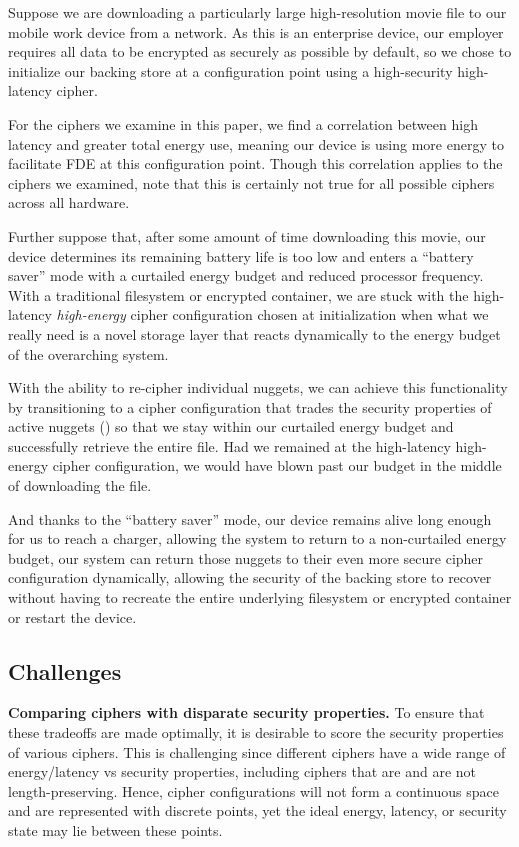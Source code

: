 Suppose we are downloading a particularly large high-resolution movie file to
our mobile work device from a network. As this is an enterprise device, our
employer requires all data to be encrypted as securely as possible by default,
so we chose to initialize our backing store at a configuration point using a
high-security high-latency cipher.

For the ciphers we examine in this paper, we find a correlation between high
latency and greater total energy use, meaning our device is using more
energy to facilitate FDE at this configuration point. Though this correlation
applies to the ciphers we examined, note that this is certainly not true for all
possible ciphers across all hardware.

Further suppose that, after some amount of time downloading this movie, our
device determines its remaining battery life is too low and enters a ``battery
saver'' mode with a curtailed energy budget and reduced processor frequency.
With a traditional filesystem or encrypted container, we are stuck with the
high-latency \emph{high-energy} cipher configuration chosen at initialization
when what we really need is a novel storage layer that reacts dynamically to the
energy budget of the overarching system.

With the ability to re-cipher individual nuggets, we can achieve this
functionality by transitioning to a cipher configuration that trades the
security properties of active nuggets () so that we stay within our
curtailed energy budget and successfully retrieve the entire file. Had we
remained at the high-latency high-energy cipher configuration, we would have
blown past our budget in the middle of downloading the file.

And thanks to the ``battery saver'' mode, our device remains alive long enough
for us to reach a charger, allowing the system to return to a non-curtailed
energy budget, our system can return those nuggets to their even more secure cipher
configuration dynamically, allowing the security of the backing store to recover
without having to recreate the entire underlying filesystem or encrypted
container or restart the device.

\subsection{Challenges}

\textbf{Comparing ciphers with disparate security properties.} To ensure that
these tradeoffs are made optimally, it is desirable to score the security
properties of various ciphers. This is challenging since different ciphers have
a wide range of energy/latency vs security properties, including ciphers that
are and are not length-preserving. Hence, cipher configurations will not form a
continuous space and are represented with discrete points, yet the ideal energy,
latency, or security state may lie between these points.

